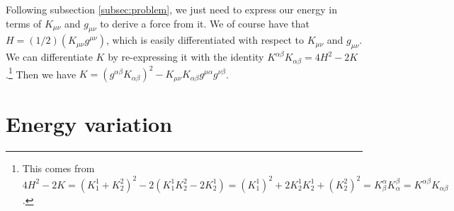 Following subsection \ref{subsec:problem}, we just need to express our energy in terms of $K_{\mu\nu}$ and $g_{\mu\nu}$ to derive a force from it. We of course have that $H = (1/2) (K_{\mu\nu} g^{\mu\nu})$, which is easily differentiated with respect to $K_{\mu\nu}$ and $g_{\mu\nu}$. We can differentiate $K$ by re-expressing it with the identity $K^{\alpha\beta}K_{\alpha\beta} = 4H^2 - 2K$.\footnote{This comes from $4H^2 - 2K = (K^1_1 + K^2_2)^2 - 2(K^1_1K^2_2 - 2K^1_2) = (K^1_1)^2 + 2 K^1_2K^1_2 + (K^2_2)^2 = K^\alpha_\beta K_\alpha^\beta = K^{\alpha\beta}K_{\alpha\beta}$.} Then we have $K = (g^{\alpha\beta}K_{\alpha\beta})^2 - K_{\mu\nu}K_{\alpha\beta}g^{\mu\alpha}g^{\nu\beta}$.

\section{Energy variation}


